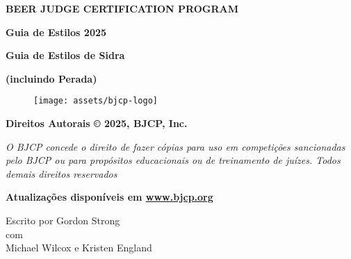\begin{titlepage}

    \centering
        {\fontsize{20}{32}\selectfont \textbf{BEER JUDGE CERTIFICATION PROGRAM}}\\

        \vspace{0.8cm}

        {\fontsize{30}{38}\selectfont \textbf{Guia de Estilos 2025 }}\\

        \vspace{0.8cm}

        {\fontsize{26}{32}\selectfont \textbf{Guia de Estilos de Sidra}}\\

        \vspace{0.2cm}

        {\fontsize{20}{32}\selectfont \textbf{(incluindo Perada)}}\\

        \begin{figure}[htp]
            \centering
            \texttt{[image: assets/bjcp-logo]}
            \label{fig:bjcp-logo}
        \end{figure}

        {\fontsize{12}{32}\selectfont \textbf{Direitos Autorais © 2025, BJCP, Inc.}}\\

        \vspace{0.3cm}

        {\fontsize{10}{32}\selectfont\textit{
            O BJCP concede o direito de fazer cópias para uso em competições sancionadas \break
            pelo BJCP ou para propósitos educacionais ou de treinamento de juízes.\break
            Todos demais direitos reservados
        }}\\

        \vspace{0.3cm}

        {\fontsize{12}{32}\selectfont \textbf{Atualizações disponíveis em \href{http://www.bjcp.org}{www.bjcp.org}}}\\

        \vspace{0.3cm}

        {\fontsize{12}{32}\selectfont Escrito por Gordon Strong}\\
        {\fontsize{9}{32}\selectfont com}\\
        {\fontsize{10}{32}\selectfont Michael Wilcox e Kristen England}\\


\end{titlepage}
